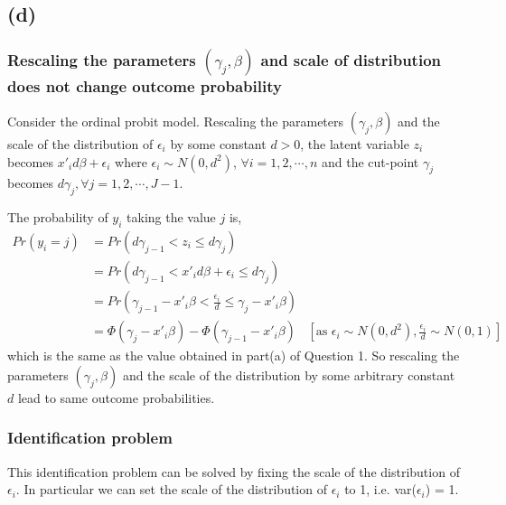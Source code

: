 \documentclass[a4paper]{article}
\begin{document}
\subsection*{(d)}

\subsubsection*{Rescaling the parameters $(\gamma_j,\beta)$ and scale of distribution does not change outcome probability}

Consider the ordinal probit model. Rescaling the parameters $(\gamma_j,\beta)$ and the scale of the distribution of $\epsilon_i$ by some constant $d > 0$, the latent variable $z_i$ becomes $x'_id\beta + \epsilon_i$ where $\epsilon_i \sim N(0,d^2)$, $\forall i = 1,2,\cdots,n$ and the cut-point $\gamma_j$ becomes $d\gamma_j, \forall j = 1, 2, \cdots, J-1$.
\vspace{0.25cm}

\noindent The probability of $y_i$ taking the value $j$ is,
\begin{align*}
    Pr(y_i=j) &= Pr(d\gamma_{j-1} < z_i \leq d\gamma_j) \\
              &= Pr(d\gamma_{j-1} < x'_i d\beta + \epsilon_i \leq d\gamma_j)\\
              &= Pr(\gamma_{j-1} - x'_i\beta < \frac{\epsilon_i}{d} \leq \gamma_j - x'_i\beta)\\
              &= \Phi(\gamma_j - x'_i\beta) - \Phi(\gamma_{j-1} - x'_i\beta) & [\text{as } \epsilon_i \sim N(0,d^2), \frac{\epsilon_i}{d} \sim N(0,1)]
\end{align*}
which is the same as the value obtained in part(a) of Question 1. So rescaling the parameters $(\gamma_j,\beta)$ and the scale of the distribution by some arbitrary constant $d$ lead to same outcome probabilities.

\subsubsection*{Identification problem}
This identification problem can be solved by fixing the scale of the distribution of $\epsilon_i$. In particular we can set the scale of the distribution of $\epsilon_i$ to 1, i.e. var($\epsilon_i$) = 1.

\pagebreak
\end{document}
